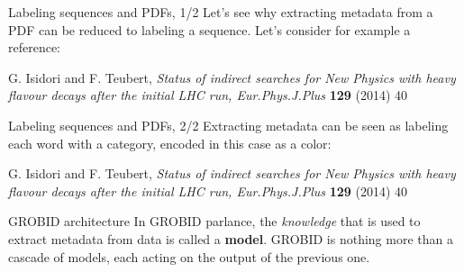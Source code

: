 \documentclass[10pt]{beamer}
\begin{document}
  \begin{frame}{Labeling sequences and PDFs, 1/2}
    Let's see why extracting metadata from a PDF can be reduced to labeling a sequence.
    Let's consider for example a reference:

    \vspace{0.5cm}

    \begin{framed}
      G. Isidori and F. Teubert, \textit{Status of indirect searches for New Physics with heavy flavour decays after the initial LHC run, Eur.Phys.J.Plus} \textbf{129} (2014) 40
    \end{framed}
  \end{frame}

  \begin{frame}{Labeling sequences and PDFs, 2/2}
    Extracting metadata can be seen as labeling each word with a category,
    encoded in this case as a color:

    \vspace{0.5cm}

    \begin{framed}
      \color{blue}G. Isidori and F. Teubert, \color{red}\textit{Status of indirect searches for New Physics with heavy flavour decays after the initial LHC run, \color{green}Eur.Phys.J.Plus} \color{green}\textbf{129} (2014) 40\color{black}
    \end{framed}
  \end{frame}

  \begin{frame}{GROBID architecture}
    In GROBID parlance, the \emph{knowledge} that is used to extract metadata
    from data is called a \textbf{model}. GROBID is nothing more than a
    cascade of models, each acting on the output of the previous one.

    \vspace{0.5cm}

  \end{frame}
\end{document}
